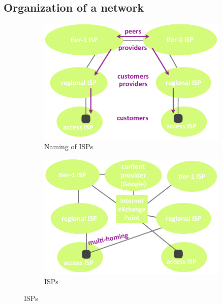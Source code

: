 \documentclass[12pt,a4paper]{article}
\begin{document}
\subsection{Organization of a network}
\begin{figure}[!h]
	\centering
	\begin{subfigure}[b]{0.45\textwidth}
		\includegraphics[scale=0.45]{images/ispsName}
		\caption{Naming of ISPs}		
		\label{fig: name of ISPs}
	\end{subfigure}		
	\quad
	\begin{subfigure}[b]{0.45\textwidth}
		 \includegraphics[scale=0.45]{images/isps}
		 \caption{ISPs} 
		 \label{fig: isps}
	\end{subfigure}
\end{figure}
\end{document}
